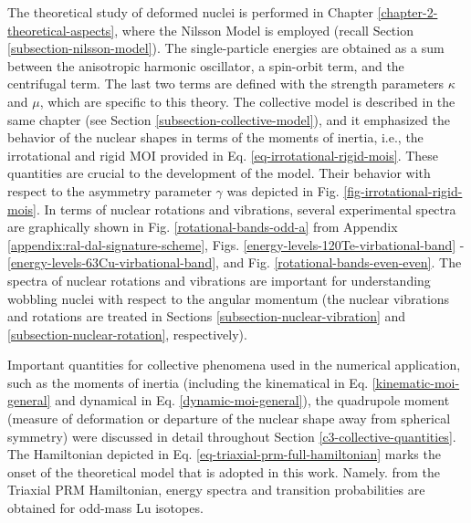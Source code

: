 The theoretical study of deformed nuclei is performed in Chapter \ref{chapter-2-theoretical-aspects}, where the Nilsson Model is employed (recall Section \ref{subsection-nilsson-model}). The single-particle energies are obtained as a sum between the anisotropic harmonic oscillator, a spin-orbit term, and the centrifugal term. The last two terms are defined with the strength parameters $\kappa$ and $\mu$, which are specific to this theory. The collective model is described in the same chapter (see Section \ref{subsection-collective-model}), and it emphasized the behavior of the nuclear shapes in terms of the moments of inertia, i.e., the irrotational and rigid MOI provided in Eq. \eqref{eq-irrotational-rigid-mois}. These quantities are crucial to the development of the model. Their behavior with respect to the asymmetry parameter $\gamma$ was depicted in Fig. \ref{fig-irrotational-rigid-mois}. In terms of nuclear rotations and vibrations, several experimental spectra are graphically shown in Fig. \ref{rotational-bands-odd-a} from Appendix \ref{appendix:ral-dal-signature-scheme}, Figs. \ref{energy-levels-120Te-virbational-band} - \ref{energy-levels-63Cu-virbational-band}, and Fig. \ref{rotational-bands-even-even}. The spectra of nuclear rotations and vibrations are important for understanding wobbling nuclei with respect to the angular momentum (the nuclear vibrations and rotations are treated in Sections \ref{subsection-nuclear-vibration} and \ref{subsection-nuclear-rotation}, respectively). 

Important quantities for collective phenomena used in the numerical application, such as the moments of inertia (including the kinematical in Eq. \eqref{kinematic-moi-general} and dynamical in Eq. \eqref{dynamic-moi-general}), the quadrupole moment (measure of deformation or departure of the nuclear shape away from spherical symmetry) were discussed in detail throughout Section \ref{c3-collective-quantities}. The Hamiltonian depicted in Eq. \eqref{eq-triaxial-prm-full-hamiltonian} marks the onset of the theoretical model that is adopted in this work. Namely. from the Triaxial PRM Hamiltonian, energy spectra and transition probabilities are obtained for odd-mass Lu isotopes.

